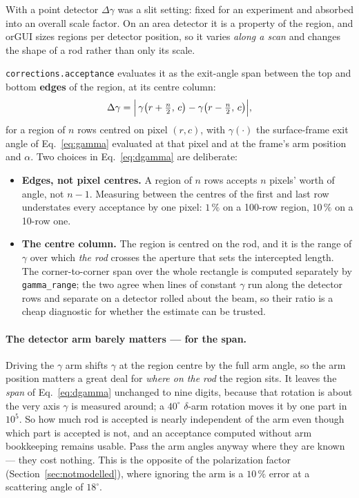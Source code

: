 \documentclass[11pt,a4paper]{article}
\newcommand{\dgam}{\Delta\gamma}
\newcommand{\code}[1]{\texttt{\small #1}}
\begin{document}
With a point detector $\dgam$ was a slit setting: fixed for an experiment and
absorbed into an overall scale factor. On an area detector it is a property of
the region, and orGUI sizes regions per detector position, so it varies
\emph{along a scan} and changes the shape of a rod rather than only its scale.

\code{corrections.acceptance} evaluates it as the exit-angle span between the
top and bottom \textbf{edges} of the region, at its centre column:
\begin{equation}
  \dgam = \Bigl|\,
    \gamma\bigl(r + \tfrac{n}{2},\, c\bigr) -
    \gamma\bigl(r - \tfrac{n}{2},\, c\bigr)\Bigr| ,
  \label{eq:dgamma}
\end{equation}
for a region of $n$ rows centred on pixel $(r,c)$, with $\gamma(\cdot)$ the
surface-frame exit angle of Eq.~\eqref{eq:gamma} evaluated at that pixel and
at the frame's arm position and $\alpha$. Two choices in
Eq.~\eqref{eq:dgamma} are deliberate:

\begin{itemize}[leftmargin=1.4em]
\item \textbf{Edges, not pixel centres.} A region of $n$ rows accepts $n$
  pixels' worth of angle, not $n-1$. Measuring between the centres of the
  first and last row understates every acceptance by one pixel: $1\,\%$ on a
  100-row region, $10\,\%$ on a 10-row one.
\item \textbf{The centre column.} The region is centred on the rod, and it is
  the range of $\gamma$ over which \emph{the rod} crosses the aperture that
  sets the intercepted length. The corner-to-corner span over the whole
  rectangle is computed separately by \code{gamma\_range}; the two agree when
  lines of constant $\gamma$ run along the detector rows and separate on a
  detector rolled about the beam, so their ratio is a cheap diagnostic for
  whether the estimate can be trusted.
\end{itemize}

\paragraph{The detector arm barely matters --- for the span.} Driving the
$\gamma$ arm shifts $\gamma$ at the region centre by the full arm angle, so
the arm position matters a great deal for \emph{where on the rod} the region
sits. It leaves the \emph{span} of Eq.~\eqref{eq:dgamma} unchanged to nine
digits, because that rotation is about the very axis $\gamma$ is measured
around; a $40^{\circ}$ $\delta$-arm rotation moves it by one part in $10^{5}$.
So how much rod is accepted is nearly independent of the arm even though which
part is accepted is not, and an acceptance computed without arm bookkeeping
remains usable. Pass the arm angles anyway where they are known --- they cost
nothing. This is the opposite of the polarization factor
(Section~\ref{sec:notmodelled}), where ignoring the arm is a $10\,\%$ error at
a scattering angle of $18^{\circ}$.
\end{document}
